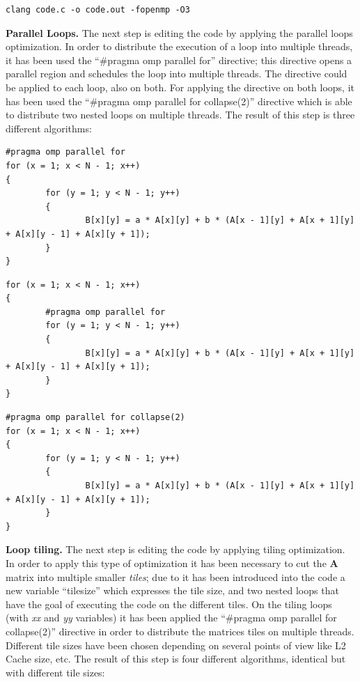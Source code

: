 \documentclass[conference]{IEEEtran}
\newcommand{\mypar}[1]{{\bf #1.}}
\begin{document}
\begin{lstlisting}[caption={Flag -O3},label={lst:optimization-flags-3}]
clang code.c -o code.out -fopenmp -O3
\end{lstlisting}

\mypar{Parallel Loops}
The next step is editing the code by applying the parallel loops optimization. In order to distribute the execution of a loop into multiple threads, it has been used the ``#pragma omp parallel for'' \cite{omp-parallel}\cite{omp-for} directive; this directive opens a parallel region and schedules the loop into multiple threads. The directive could be applied to each loop, also on both. For applying the directive on both loops, it has been used the ``#pragma omp parallel for collapse(2)'' \cite{omp-collapse} directive which is able to distribute two nested loops on multiple threads. The result of this step is three different algorithms:

\setcounter{lstlisting}{2}
\renewcommand{\lstlistingname}{Algorithm}

\begin{lstlisting}[caption={Parallel loop on X},label={lst:parallel-loop-x}]
#pragma omp parallel for
for (x = 1; x < N - 1; x++)
{
		for (y = 1; y < N - 1; y++)
		{
				B[x][y] = a * A[x][y] + b * (A[x - 1][y] + A[x + 1][y] + A[x][y - 1] + A[x][y + 1]);
		}
}
\end{lstlisting}

\begin{lstlisting}[caption={Parallel loop on Y},label={lst:parallel-loop-y}]
for (x = 1; x < N - 1; x++)
{
		#pragma omp parallel for
		for (y = 1; y < N - 1; y++)
		{
				B[x][y] = a * A[x][y] + b * (A[x - 1][y] + A[x + 1][y] + A[x][y - 1] + A[x][y + 1]);
		}
}
\end{lstlisting}

\begin{lstlisting}[caption={Parallel loop on X and Y},label={lst:parallel-loop-x-y}]
#pragma omp parallel for collapse(2)
for (x = 1; x < N - 1; x++)
{
		for (y = 1; y < N - 1; y++)
		{
				B[x][y] = a * A[x][y] + b * (A[x - 1][y] + A[x + 1][y] + A[x][y - 1] + A[x][y + 1]);
		}
}
\end{lstlisting}

\mypar{Loop tiling}
The next step is editing the code by applying tiling optimization. In order to apply this type of optimization it has been necessary to cut the \textbf{A} matrix into multiple smaller \textit{tiles}; due to it has been introduced into the code a new variable ``tile\textunderscore size'' which expresses the tile size, and two nested loops that have the goal of executing the code on the different tiles. On the tiling loops (with \textit{xx} and \textit{yy} variables) it has been applied the ``#pragma omp parallel for collapse(2)'' directive in order to distribute the matrices tiles on multiple threads. Different tile sizes have been chosen depending on several points of view like L2 Cache size, etc. The result of this step is four different algorithms, identical but with different tile sizes:
\end{document}
